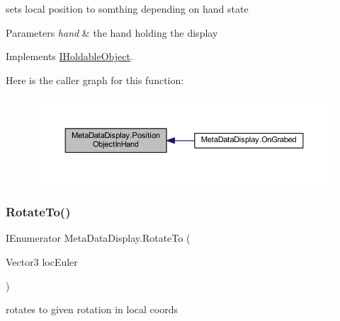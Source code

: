 sets local position to somthing depending on hand state 


\begin{DoxyParams}{Parameters}
{\em hand} & the hand holding the display\\
\hline
\end{DoxyParams}


Implements \mbox{\hyperlink{interface_i_holdable_object_a3fe2e7a7d0740225142053583f438333}{I\+Holdable\+Object}}.

Here is the caller graph for this function\+:\nopagebreak
\begin{figure}[H]
\begin{center}
\leavevmode
\includegraphics[width=350pt]{class_meta_data_display_a1ecbc336a25464fc9999120066263e2a_icgraph}
\end{center}
\end{figure}
\mbox{\label{class_meta_data_display_adee283ec76c3631bf535ae3e5071090b}} 
\subsubsection{\texorpdfstring{Rotate\+To()}{RotateTo()}}
{\footnotesize\ttfamily I\+Enumerator Meta\+Data\+Display.\+Rotate\+To (\begin{DoxyParamCaption}\item[{Vector3}]{loc\+Euler }\end{DoxyParamCaption})\hspace{0.3cm}{\ttfamily [private]}}



rotates to given rotation in local coords 


